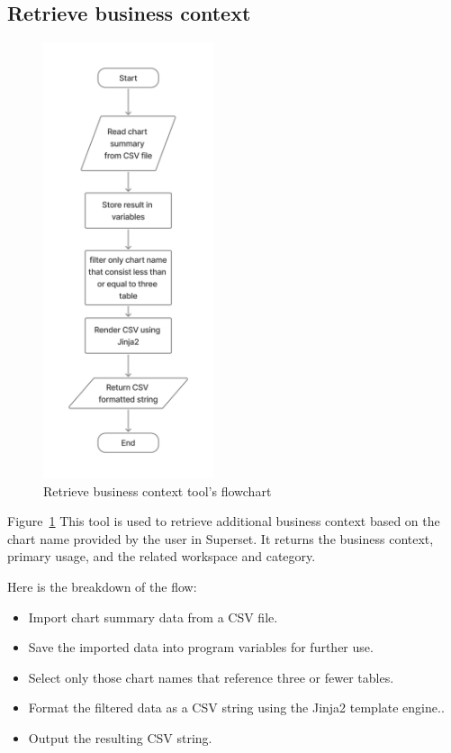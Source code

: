     \subsection{Retrieve business context}
    \begin{figure}[H]
        \centering
        \includegraphics[width=5cm]{chapters/3/figures/chart_summary.jpg}
        \caption[Retrieve business context tool’s flowchart]{Retrieve business context tool’s flowchart}
        \label{fig:chart_summary}
    \end{figure}
    Figure~\ref{fig:chart_summary} This tool is used to retrieve additional business context based on the chart name provided by the user in Superset. It returns the business context, primary usage, and the related workspace and category.

    Here is the breakdown of the flow:
    \begin{itemize}
        \item  Import chart summary data from a CSV file.
        \item  Save the imported data into program variables for further use.
        \item  Select only those chart names that reference three or fewer tables.
        \item  Format the filtered data as a CSV string using the Jinja2 template engine..
        \item  Output the resulting CSV string.
    \end{itemize}


